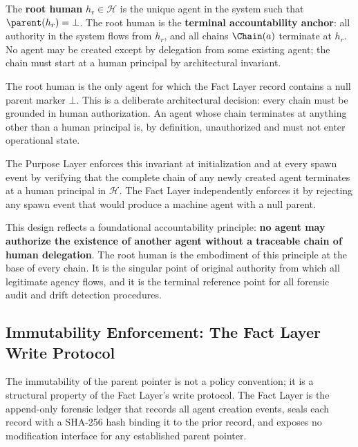 \begin{dfn}
\label{dfn:root_human_def}
The \textbf{root human} $h_r \in \mathcal{H}$ is the unique agent in the system such that $\parent(h_r) = \bot$. The root human is the \textbf{terminal accountability anchor}: all authority in the system flows from $h_r$, and all chains $\Chain(a)$ terminate at $h_r$. No agent may be created except by delegation from some existing agent; the chain must start at a human principal by architectural invariant.
\end{dfn}

The root human is the only agent for which the Fact Layer record contains a null parent marker $\bot$. This is a deliberate architectural decision: every chain must be grounded in human authorization. An agent whose chain terminates at anything other than a human principal is, by definition, unauthorized and must not enter operational state.

The Purpose Layer enforces this invariant at initialization and at every spawn event by verifying that the complete chain of any newly created agent terminates at a human principal in $\mathcal{H}$. The Fact Layer independently enforces it by rejecting any spawn event that would produce a machine agent with a null parent.

This design reflects a foundational accountability principle: \textbf{no agent may authorize the existence of another agent without a traceable chain of human delegation}. The root human is the embodiment of this principle at the base of every chain. It is the singular point of original authority from which all legitimate agency flows, and it is the terminal reference point for all forensic audit and drift detection procedures.

\subsection{Immutability Enforcement: The Fact Layer Write Protocol}
\label{sec:fact_layer_enforcement}

The immutability of the parent pointer is not a policy convention; it is a structural property of the Fact Layer's write protocol. The Fact Layer is the append-only forensic ledger that records all agent creation events, seals each record with a SHA-256 hash binding it to the prior record, and exposes no modification interface for any established parent pointer.

